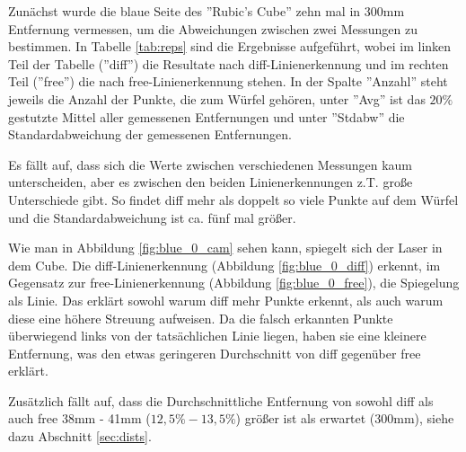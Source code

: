 \documentclass[ngerman,a4paper,parskip=half]{scrartcl}
\begin{document}
Zunächst wurde die blaue Seite des ''Rubic's Cube'' zehn mal in 300mm Entfernung vermessen, um die Abweichungen zwischen zwei Messungen zu bestimmen. In Tabelle \ref{tab:reps} sind die Ergebnisse aufgeführt, wobei im linken Teil der Tabelle (''diff'') die Resultate nach diff-Linienerkennung und im rechten Teil (''free'') die nach free-Linienerkennung stehen. In der Spalte ''Anzahl'' steht jeweils die Anzahl der Punkte, die zum Würfel gehören, unter ''Avg'' ist das $20 \%$ gestutzte Mittel aller gemessenen Entfernungen und unter ''Stdabw'' die Standardabweichung der gemessenen Entfernungen.

Es fällt auf, dass sich die Werte zwischen verschiedenen Messungen kaum unterscheiden, aber es zwischen den beiden Linienerkennungen z.T. große Unterschiede gibt. So findet diff mehr als doppelt so viele Punkte auf dem Würfel und die Standardabweichung ist ca. fünf mal größer.

Wie man in Abbildung \ref{fig:blue_0_cam} sehen kann, spiegelt sich der Laser in dem Cube. Die diff-Linienerkennung (Abbildung \ref{fig:blue_0_diff}) erkennt, im Gegensatz zur free-Linienerkennung (Abbildung \ref{fig:blue_0_free}), die Spiegelung als Linie. Das erklärt sowohl warum diff mehr Punkte erkennt, als auch warum diese eine höhere Streuung aufweisen. Da die falsch erkannten Punkte überwiegend links von der tatsächlichen Linie liegen, haben sie eine kleinere Entfernung, was den etwas geringeren Durchschnitt von diff gegenüber free erklärt.

Zusätzlich fällt auf, dass die Durchschnittliche Entfernung von sowohl diff als auch free 38mm - 41mm ($12,5\%-13,5\%$) größer ist als erwartet (300mm), siehe dazu Abschnitt \ref{sec:dists}.
\end{document}
